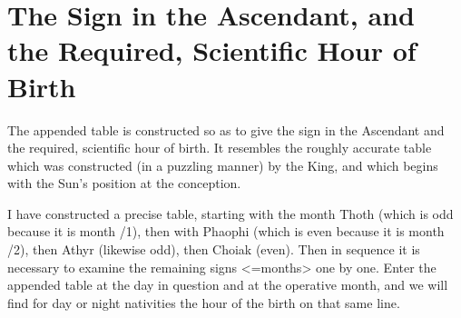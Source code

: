 \section{The Sign in the Ascendant, and the Required, Scientific Hour of Birth}

The appended table is constructed so as to give the sign in the Ascendant and the required, scientific hour of birth. It resembles the roughly accurate table which was constructed (in a puzzling manner) by the King, and which begins with the Sun’s position at the conception. 

I have constructed a precise table, starting with the month Thoth (which is odd because it is month /1), then with Phaophi (which is even because it is month /2), then Athyr (likewise odd), then Choiak (even). Then in sequence it is necessary to examine the remaining signs <=months> one by one. Enter the appended table at the day in question and at the operative month, and we will find for day or night nativities the hour of the birth on that same line.

\newpage